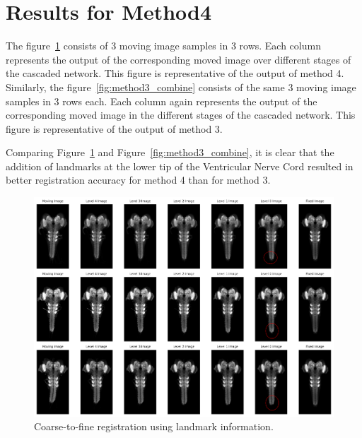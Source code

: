 \documentclass{report}
\begin{document}
	\section{Results for Method4}
	The figure~\ref{fig:method4_combine} consists of 3 moving image samples in 3 rows. Each column represents the output of the corresponding moved image over different stages of the cascaded network. This figure is representative of the output of method 4. Similarly, the figure~\ref{fig:method3_combine} consists of the same 3 moving image samples in 3 rows each. Each column again represents the output of the corresponding moved image in the different stages of the cascaded network. This figure is representative of the output of method 3.
	
	Comparing Figure~\ref{fig:method4_combine} and Figure~\ref{fig:method3_combine}, it is clear that the addition of landmarks at the lower tip of the Ventricular Nerve Cord resulted in better registration accuracy for method 4 than for method 3.
	
	\begin{figure}[p!]
		\centering
		\includegraphics[width=\columnwidth]{resources/chapter4/method4/ldm/registered_images.png}
		\caption{Coarse-to-fine registration using landmark information.}
		\label{fig:method4_combine}
	\end{figure}
	
\end{document}
